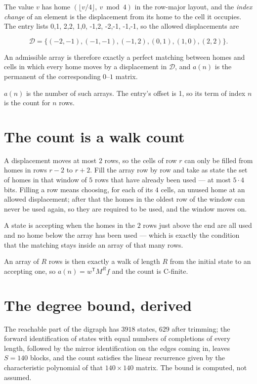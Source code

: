\documentclass[11pt]{article}
\theoremstyle{definition}
\begin{document}
The value $v$ has home $(\lfloor v/4\rfloor,\ v \bmod 4)$ in the row-major layout, and the {\itshape index change} of an element is the displacement from its home to the cell it occupies. The entry lists 0,1, 2,2, 1,0, -1,2, -2,-1, -1,-1, so the allowed displacements are

\[\mathcal{D} = \{(-2,-1), (-1,-1), (-1,2), (0,1), (1,0), (2,2)\}.\]

An admissible array is therefore exactly a perfect matching between homes and cells in which every home moves by a displacement in $\mathcal{D}$, and $a(n)$ is the permanent of the corresponding $0$--$1$ matrix.

$a(n)$ is the number of such arrays. The entry's offset is 1, so its term of index $n$ is the count for $n$ rows.

\section{The count is a walk count}

A displacement moves at most $2$ rows, so the cells of row $r$ can only be filled from homes in rows $r-2$ to $r+2$. Fill the array row by row and take as state the set of homes in that window of $5$ rows that have already been used --- at most $5\cdot4$ bits. Filling a row means choosing, for each of its $4$ cells, an unused home at an allowed displacement; after that the homes in the oldest row of the window can never be used again, so they are required to be used, and the window moves on.

A state is accepting when the homes in the $2$ rows just above the end are all used and no home below the array has been used --- which is exactly the condition that the matching stays inside an array of that many rows.

An array of $R$ rows is then exactly a walk of length $R$ from the initial state to an accepting one, so $a(n) = w^{\mathsf T}M^{R}f$ and the count is C-finite.

\section{The degree bound, derived}

The reachable part of the digraph has $3918$ states, $629$ after trimming; the forward identification of states with equal numbers of completions of every length, followed by the mirror identification on the edges coming in, leaves $S = 140$ blocks, and the count satisfies the linear recurrence given by the characteristic polynomial of that $140\times140$ matrix. The bound is computed, not assumed.
\end{document}
